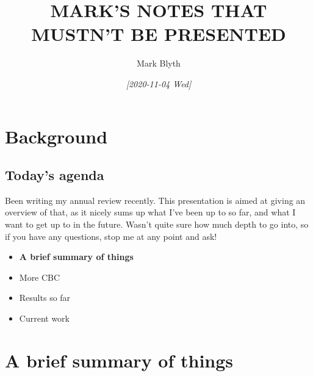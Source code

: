 \documentclass[11pt]{article}
\author{Mark Blyth}
\date{\textit{[2020-11-04 Wed]}}
\title{MARK'S NOTES THAT MUSTN'T BE PRESENTED}
\begin{document}
\maketitle

\section{Background}
\label{sec:orgac975df}
\subsection{Today's agenda}
\label{sec:org0a28696}

Been writing my annual review recently.
This presentation is aimed at giving an overview of that, as it nicely sums up what I've been up to so far, and what I want to get up to in the future.
Wasn't quite sure how much depth to go into, so if you have any questions, stop me at any point and ask!

\begin{itemize}
\item \textbf{A brief summary of things}

\item More CBC

\item Results so far

\item Current work
\end{itemize}


\section{A brief summary of things}
\label{sec:org60c2056}
\end{document}
